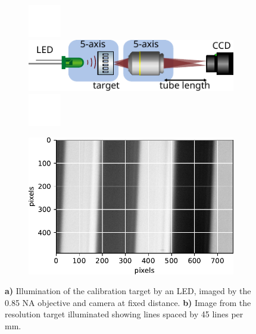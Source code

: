 \begin{figure}
	\begin{subfigure}{.5\textwidth}
	    \flushleft
	    \includegraphics[height=1.44cm]{figures/white.jpeg}
	    \includegraphics[width=\linewidth]{figures/LEDcalibration.pdf}
	    \includegraphics[height=1.44cm]{figures/white.jpeg}
		\caption{}
		\label{fig:SetupResolutionTarget}
	\end{subfigure}
	\hfill
	\begin{subfigure}{.45\textwidth}
	    \flushright
		\includegraphics[width=\linewidth]{figures/LineSpacingCalibration.pdf}
		\caption{}
		\label{fig:3Dwaistfit}
	\end{subfigure}
	\caption{\textsf{\textbf{a)}} Illumination of the calibration target by an LED, imaged by the 0.85 NA objective and camera at fixed distance.
	\textsf{\textbf{b)}} Image from the resolution target illuminated showing lines spaced by 45 lines per mm.}
	\label{fig:resolutionTarget}
\end{figure}

